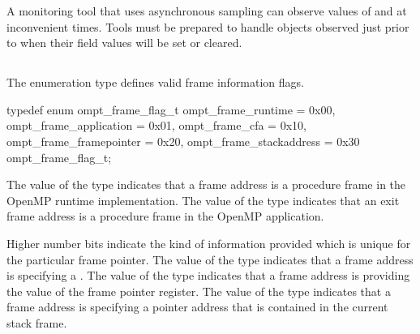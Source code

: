 \begin{note}
A monitoring tool that uses asynchronous sampling can observe values
of  and  at inconvenient times.
Tools must be prepared to handle  objects observed 
just prior to when their field values will be set or cleared.
\end{note}



\subsection{}
\label{subsubsec:ompt_frame_flag_t}

\summary
The  enumeration type defines valid frame 
information flags.

\syntax
\begin{ccppspecific}
\begin{ompSyntax}
typedef enum ompt_frame_flag_t {
  ompt_frame_runtime        = 0x00,
  ompt_frame_application    = 0x01,
  ompt_frame_cfa            = 0x10,
  ompt_frame_framepointer   = 0x20,
  ompt_frame_stackaddress   = 0x30
} ompt_frame_flag_t; 
\end{ompSyntax}
\end{ccppspecific}

\descr
The value  of the  type
indicates that a frame address is a procedure frame in the OpenMP runtime 
implementation. The value  of the 
 type indicates that an exit frame address is a 
procedure frame in the OpenMP application.

Higher number bits indicate the kind of information provided which is unique
for the particular frame pointer. The value  of the 
 type indicates that a frame address is specifying 
a . The value  
of the  type indicates that a frame address is 
providing the value of the frame pointer register. The value 
 of the  type
indicates that a frame address is specifying a pointer address that is
contained in the current stack frame.
